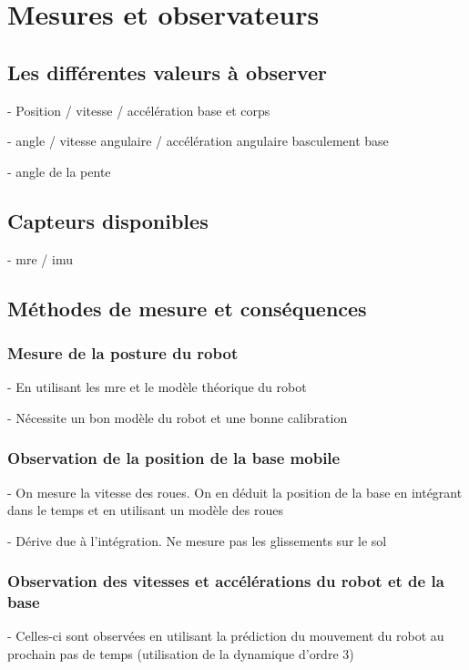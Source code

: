 \chapter{Mesures et observateurs}
	\section{Les différentes valeurs à observer}

		- Position / vitesse / accélération base et corps

		- angle / vitesse angulaire / accélération angulaire basculement base

		- angle de la pente

	\section{Capteurs disponibles}

		- mre / imu

	\section{Méthodes de mesure et conséquences}
		\subsection{Mesure de la posture du robot}

			- En utilisant les mre et le modèle théorique du robot
			
			- Nécessite un bon modèle du robot et une bonne calibration

		\subsection{Observation de la position de la base mobile}
		\label{section.observateurbase}
			- On mesure la vitesse des roues. On en déduit la position de la base en intégrant dans le temps et en utilisant un modèle des roues

			- Dérive due à l'intégration. Ne mesure pas les glissements sur le sol

		\subsection{Observation des vitesses et accélérations du robot et de la base}

			- Celles-ci sont observées en utilisant la prédiction du mouvement du robot au prochain pas de temps (utilisation de la dynamique d'ordre 3)


